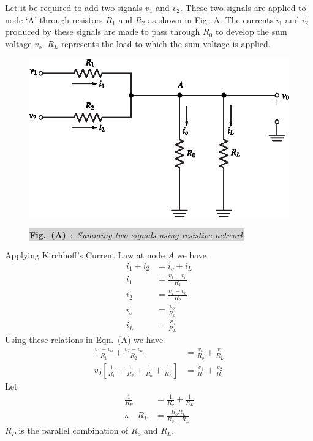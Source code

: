 \begin{solution}
Let it be required to add two signals $v_{1}$ and $v_{2}$. These two signals are applied to node `A' through resistors $R_{1}$ and $R_{2}$ as shown in Fig.~A. The currents $i_{1}$ and $i_{2}$ produced by these signals are made to pass through $R_{0}$ to develop the sum voltage $v_{o}$. $R_{L}$ represents the load to which the sum voltage is applied.
\begin{figure}[H]
\centering
\includegraphics{chap4/sol4.27.eps}

\medskip
\colorbox{lightgray}{{\bf Fig.~(A)}~:~\em Summing two signals using resistive network}
\end{figure}
Applying Kirchhoff's Current Law at node $A$ we have
\begin{align*}
i_{1}+i_{2} &= i_{o}+i_{L}\tag{A}\\[7pt]
i_{1} &= \frac{v_{1}-v_{o}}{R_{1}}\\[3pt]
i_{2} &= \frac{v_{2}-v_{o}}{R_{2}}\\[3pt]
i_{o} &= \frac{v_{o}}{R_{o}}\\[3pt]
i_{L} &= \frac{v_{o}}{R_{L}}
\end{align*}
Using these relations in Eqn.~(A) we have
\begin{align*}
\frac{v_{1}-v_{o}}{R_{1}}+\frac{v_{2}-v_{o}}{R_{2}} &= \frac{v_{o}}{R_{o}}+\frac{v_{o}}{R_{L}}\\[3pt]
v_{0}\left[\frac{1}{R_{1}}+\frac{1}{R_{2}}+\frac{1}{R_{o}}+\frac{1}{R_{L}}\right] &= \frac{v_{1}}{R_{1}}+\frac{v_{2}}{R_{2}}\tag{B}
\end{align*}
Let
\begin{align*}
\frac{1}{R_{P}} &= \frac{1}{R_{o}}+\frac{1}{R_{L}}\tag{C}\\[3pt]
\therefore\quad R_{P} &= \frac{R_{o}R_{L}}{R_{0}+R_{L}}\tag{D}
\end{align*}
$R_{P}$ is the parallel combination of $R_{o}$ and $R_{L}$.


\end{solution}
